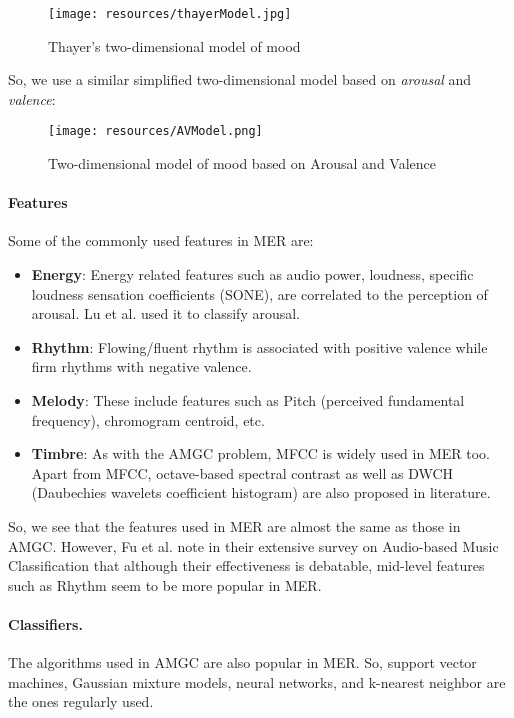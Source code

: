 \begin{figure}[hlvt!]
        \centering
        \texttt{[image: resources/thayerModel.jpg]}
        \caption{Thayer's two-dimensional model of mood}
        \label{fig:figure3}
\end{figure}

So, we use a similar simplified two-dimensional model based on \textit{arousal} and \textit{valence}:
\begin{figure}[hlvt!]
        \centering
        \texttt{[image: resources/AVModel.png]}
        \caption{Two-dimensional model of mood based on Arousal and Valence}
        \label{fig:figure3}
\end{figure}

\paragraph{Features}

Some of the commonly used features in MER are:

\begin{itemize}
    \item \textbf{Energy}: Energy related features such as audio power, loudness, specific loudness sensation coefficients (SONE), are correlated to the perception of arousal. 
        Lu et al. \cite{Lu2006} used it to classify arousal.

    \item \textbf{Rhythm}: Flowing/fluent rhythm is associated with positive valence while firm rhythms with negative valence.

    \item \textbf{Melody}: These include features such as Pitch (perceived fundamental frequency), chromogram centroid, etc.

    \item \textbf{Timbre}: As with the AMGC problem, MFCC is widely used in MER too. Apart from MFCC, octave-based spectral contrast as well as DWCH (Daubechies wavelets coefficient histogram) are also proposed in literature.
        
\end{itemize}

So, we see that the features used in MER are almost the same as those in AMGC. However, Fu et al. note in their extensive survey on Audio-based Music Classification \cite{Fu2011} that although their effectiveness is debatable, mid-level features such as Rhythm seem to be more popular in MER.


\paragraph{Classifiers.}

The algorithms used in AMGC are also popular in MER. So, support vector machines, Gaussian mixture models, neural networks, and k-nearest neighbor are the ones regularly used.

